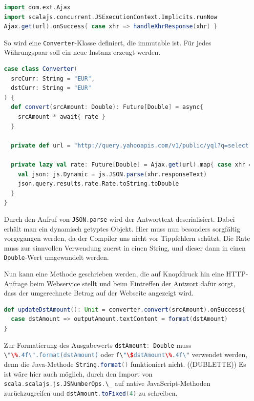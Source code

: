 \documentclass[a4paper, 12pt, hidelinks, listof=totoc, listoftables=totoc, bibliography=totoc]{scrreprt}
\newcommand{\scala}[1]{\lstinline[language=Scala, style=inline]|#1|}
\begin{document}
\begin{lstlisting}[language=Scala, caption={Futures-basierter HTTP-Aufruf mit Scala.js-Bequemlichkeitsmethode.}]
import dom.ext.Ajax
import scalajs.concurrent.JSExecutionContext.Implicits.runNow
Ajax.get(url).onSuccess{ case xhr => handleXhrResponse(xhr) }
\end{lstlisting}

So wird eine \scala{Converter}-Klasse definiert, die immutable ist. Für jedes Währungspaar soll ein neue Instanz erzeugt werden.

\begin{lstlisting}[language=Scala, caption={Der Währungsumrechner.}]
case class Converter(
  srcCurr: String = "EUR",
  dstCurr: String = "EUR"
) {
  def convert(srcAmount: Double): Future[Double] = async{
    srcAmount * await{ rate }
  }

  private def url = "http://query.yahooapis.com/v1/public/yql?q=select * from yahoo.finance.xchange where pair in ('" + srcCurr + dstCurr + "')&format=json&env=store://datatables.org/alltableswithkeys"

  private lazy val rate: Future[Double] = Ajax.get(url).map{ case xhr =>
    val json: js.Dynamic = js.JSON.parse(xhr.responseText)
    json.query.results.rate.Rate.toString.toDouble
  }
}
\end{lstlisting}

Durch den Aufruf von \scala{JSON.parse} wird der Antworttext deserialisiert. Dabei erhält man ein dynamisch getyptes Objekt. Hier muss nun besonders sorgfältig vorgegangen werden, da der Compiler uns nicht vor Tippfehlern schützt. Die Rate muss zur sinnvollen Verwendung zuerst in einen String, und dieser dann in einen \scala{Double}-Wert umgewandelt werden.

Nun kann eine Methode geschrieben werden, die auf Knopfdruck hin eine HTTP-Anfrage beim Webservice stellt und beim Eintreffen der Antwort dafür sorgt, dass der umgerechnete Betrag auf der Webseite angezeigt wird.

\begin{lstlisting}[language=Scala, style=snippet]
def updateDstAmount(): Unit = converter.convert(srcAmount).onSuccess{
  case dstAmount => outputAmount.textContent = format(dstAmount)
}
\end{lstlisting}

Zur Formatierung des Ausgabewerts \scala{dstAmount: Double} muss \scala{\"\%.4f\".format(dstAmount)} oder \scala{f\"\$dstAmount\%.4f\"} verwendet werden, denn die Java-Methode \scala{String.format()} funktioniert nicht. ((DUBLETTE)) Es ist wäre hier auch möglich, durch den Import von \scala{scala.scalajs.js.JSNumberOps.\_}
auf native JavaScript-Methoden zurückzugreifen und \scala{dstAmount.toFixed(4)} zu schreiben.
\end{document}
